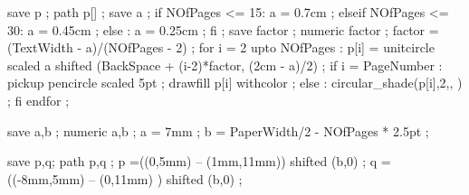


\unprotect


% 
% 

\def\simpleslidescounter{simpleslides:shaded:counter5}

save p ; path p[] ;
save a ; 
if NOfPages <= 15:
	a = 0.7cm ;
elseif NOfPages <= 30:
	a = 0.45cm ;
else :
	a = 0.25cm ;
fi ;
save factor ; numeric factor ;
factor = (TextWidth - a)/(NOfPages - 2) ;
for i = 2 upto NOfPages :
	p[i] = unitcircle scaled a shifted (BackSpace + (i-2)*factor, (2cm - a)/2) ;
	if i = PageNumber :
		pickup pencircle scaled 5pt ;
		drawfill p[i] withcolor  ;
	else :
		circular_shade(p[i],2,, ) ;
	fi
endfor ;
\stopuseMPgraphic

save a,b ;
numeric a,b ;
a = 7mm ;
b = PaperWidth/2 - NOfPages * 2.5pt ;

save p,q; path p,q ;
p =((0,5mm)    -- (1mm,11mm)) shifted (b,0) ;
q =((-8mm,5mm) -- (0,11mm)  ) shifted (b,0) ;


